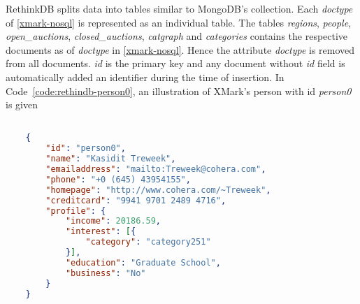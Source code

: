 RethinkDB splits data into tables similar to MongoDB's collection.  Each \textit{doctype} of \ref{xmark-nosql} is represented as an individual table. The tables \textit{regions}, \textit{people}, \textit{open\_auctions}, \textit{closed\_auctions}, \textit{catgraph} and \textit{categories} contains the respective documents as of \textit{doctype} in \ref{xmark-nosql}. Hence the attribute \textit{doctype} is removed from all documents.  \textit{id} is the primary key and any document without \textit{id} field is automatically added an identifier during the time of insertion. In Code~\ref{code:rethindb-person0}, an illustration of XMark's person with id \textit{person0} is given
\begin{lstlisting}[language=JSON,caption=Rethinkdb document person0 in people table, label=code:rethindb-person0]

	{
		"id": "person0",
		"name": "Kasidit Treweek",
		"emailaddress": "mailto:Treweek@cohera.com",
		"phone": "+0 (645) 43954155",
		"homepage": "http://www.cohera.com/~Treweek",
		"creditcard": "9941 9701 2489 4716",
		"profile": {
			"income": 20186.59,
			"interest": [{
				"category": "category251"
			}],
			"education": "Graduate School",
			"business": "No"
		}
	}
\end{lstlisting}	
